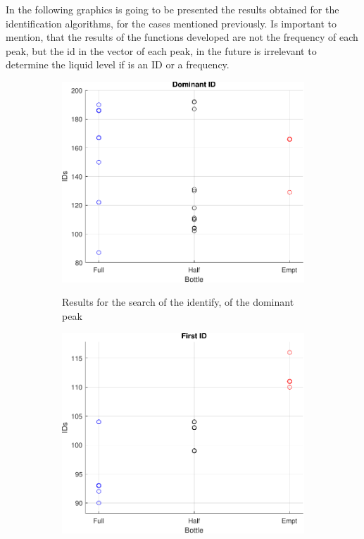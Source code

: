 In the following graphics is going to be presented the results obtained for the identification algorithms, for the cases mentioned previously. Is important to mention, that the results of the functions developed are not the frequency of each peak, but the id in the vector of each peak, in the future is irrelevant to determine the liquid level if is an ID or a frequency.
\begin{figure}[]
    \centering
    \begin{subfigure}{0.45\textwidth}
        \centering
        \includegraphics[width=\linewidth]{Chapters/6CHP/Figures/ResultsuCGraphs/MIC/BotMiddomID.pdf}
        \caption{Results for the search of the identify, of the dominant peak}{}
        \label{subfig:domIDMIC}
    \end{subfigure}
    \begin{subfigure}{0.45\textwidth}
        \centering
        \includegraphics[width=\linewidth]{Chapters/6CHP/Figures/ResultsuCGraphs/MIC/BotMidfID.pdf}

\end{subfigure}
\end{figure}
